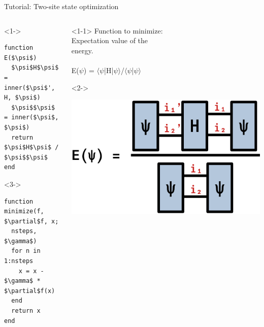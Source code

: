 \begin{frame}[fragile]{Tutorial: Two-site state optimization}

\begin{columns}

\begin{column}{5cm}

\begin{onlyenv}<1->
\begin{lstlisting}[language=JuliaLocal, style=julia, mathescape, basicstyle=\small]
function E($\psi$)
  $\psi$H$\psi$ = inner($\psi$', H, $\psi$)
  $\psi$$\psi$ = inner($\psi$, $\psi$)
  return $\psi$H$\psi$ / $\psi$$\psi$
end
\end{lstlisting}
\end{onlyenv}

\begin{onlyenv}<3->
\begin{lstlisting}[language=JuliaLocal, style=julia, mathescape, basicstyle=\small]
function minimize(f, $\partial$f, x;
  nsteps, $\gamma$)
  for n in 1:nsteps
    x = x - $\gamma$ * $\partial$f(x)
  end
  return x
end
\end{lstlisting}
\end{onlyenv}

\end{column}

\begin{column}{5cm}

\begin{onlyenv}<1-1>
Function to minimize: \\
Expectation value of the \\
energy. \\
~\\
E($\psi$) = $\langle$$\psi$|H|$\psi$$\rangle$/$\langle$$\psi$|$\psi$$\rangle$
\end{onlyenv}

\begin{onlyenv}<2->
\vspace*{0.0cm}
\begin{center}
\includegraphics[width=1.0\textwidth]{
  slides/assets/psi12Hpsi12.png
}
\end{center}
\vspace*{0.0cm}
\end{onlyenv}


\end{column}
\end{columns}
\end{frame}
